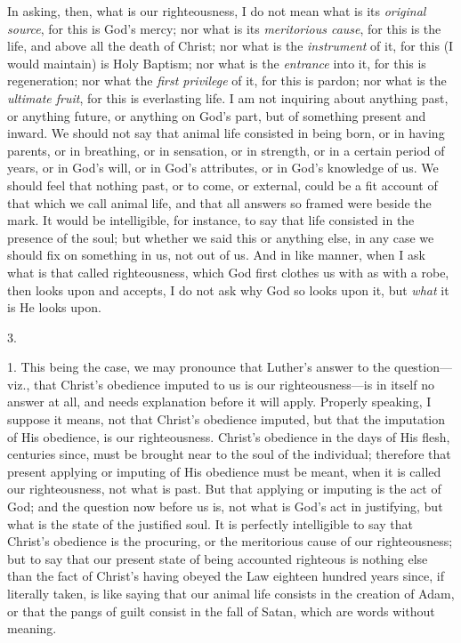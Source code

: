 In asking, then, what is our righteousness, I do not mean what is
its \emph{original source}, for this is God's mercy; nor what is its \emph{meritorious
cause}, for this is the life, and above all the death of Christ;
nor what is the \emph{instrument} of it, for this (I would maintain)
is Holy Baptism; nor what is the \emph{entrance} into it, for this is
regeneration; nor what the \emph{first privilege} of it, for this is
pardon; nor what is the \emph{ultimate fruit}, for this is
everlasting life. I am not inquiring about anything past, or anything
future, or anything on God's part, but of something present and
inward. We should not say that animal life consisted in being born, or
in having parents, or in breathing, or in sensation, or in strength,
or in a certain period of years, or in God's will, or in God's
attributes, or in God's knowledge of us. We should feel that nothing
past, or to come, or external, could be a fit account of that which we
call animal life, and that all answers so framed were beside the mark.
It would be intelligible, for instance, to say that life consisted in
the presence of the soul; but whether we said this or anything else,
in any case we should fix on something in us, not out of us. And in
like manner, when I ask what is that called righteousness, which God
first clothes us with as with a robe, then looks upon and accepts, I
do not ask why God so looks upon it, but \emph{what} it is He looks
upon.

3.

1. This being the case, we may pronounce that Luther's answer to
the question—viz., that Christ's obedience imputed to us is our
righteousness—is in itself no answer at all, and needs explanation
before it will apply. Properly speaking, I suppose it means, not that
Christ's obedience imputed, but that the imputation of His obedience,
is our righteousness. Christ's obedience in the days of His flesh,
centuries since, must be brought near to the soul of the individual;
therefore that present applying or imputing of His obedience must be
meant, when it is called our righteousness, not what is past.
But that applying or imputing is the act of God; and the question now
before us is, not what is God's act in justifying, but what is the
state of the justified soul. It is perfectly intelligible to say that
Christ's obedience is the procuring, or the meritorious cause of our
righteousness; but to say that our present state of being accounted
righteous is nothing else than the fact of Christ's having obeyed the
Law eighteen hundred years since, if literally taken, is like saying
that our animal life consists in the creation of Adam, or that the
pangs of guilt consist in the fall of Satan, which are words without
meaning.

